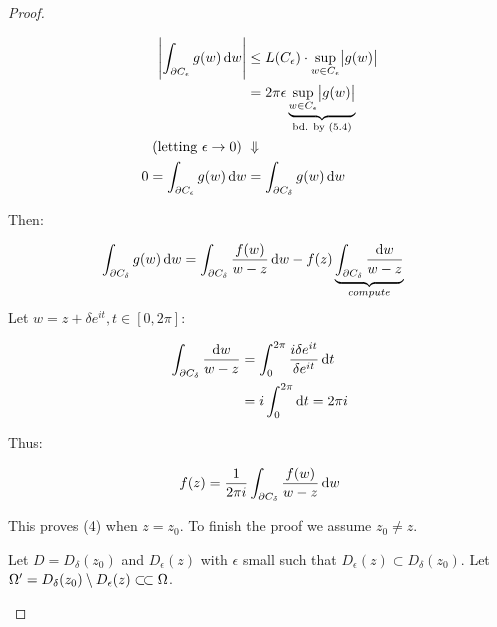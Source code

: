 \begin{proof}
\begin{enumerate}
    \begin{align*}
        \abs{\int_{\partial C_\epsilon} g(w)  \dif w} &\leq L(C_\epsilon) \cdot \sup_{w\in C_\epsilon} \abs{g(w)}\\
        &= 2\pi \epsilon \underbrace{\sup_{w\in C_\epsilon} \abs{g(w)}}_{\text{bd. by (5.4)}}\\
        \text{(letting $\epsilon \rightarrow 0$) } & \Downarrow\\
        0 = \int_{\partial C_\epsilon} g(w)  \dif w &= \int_{\partial C_\delta} g(w)  \dif w
    \end{align*}
    
    Then:
    
    \begin{align*}
        \int_{\partial C_\delta} g(w)  \dif w &= \int_{\partial C_\delta} \frac{f(w)}{w-z}  \dif w - f(z) \underbrace{\int_{\partial C_\delta} \frac{ \dif w}{w-z}}_{compute}
    \end{align*}
    Let $w=z+\delta e^{it}, t\in [0,2\pi]$:
    
    \begin{align*}
        \int_{\partial C_\delta} \frac{ \dif w}{w-z} &= \int_{0}^{2\pi} \frac{i\delta e^{it}}{\delta e^{it}} \dif t\\
        &= i\int_{0}^{2\pi} \dif t =2 \pi i
    \end{align*}
    
    Thus:
    
    \begin{align*}
         f(z) = \frac{1}{2\pi i}\int_{\partial C_\delta} \frac{f(w)}{w-z}  \dif w 
    \end{align*}
    
    This proves (4) when $z=z_0$. To finish the proof we assume $z_0 \neq z$.
    
    Let $D=D_\delta(z_0)$ and $D_\epsilon (z)$ with $\epsilon$ small such that $D_\epsilon (z) \subset D_\delta(z_0)$. Let $\Omega' = D_\delta(z_0) \setminus D_\epsilon (z) \ssubset \Omega$.
    
        
    \begin{center}
\end{center}
\end{enumerate}
\end{proof}

